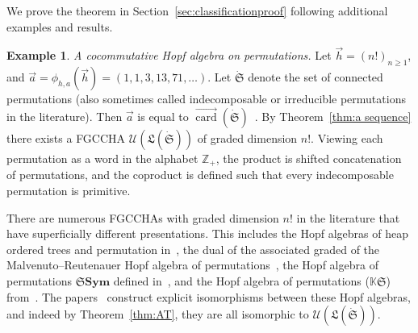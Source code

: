 \documentclass[11pt]{amsart}
\theoremstyle{definition}
\newtheorem{example}[theorem]{Example}
\numberwithin{equation}{section}
\def\ZZ{{\mathbb Z}}
\newcommand{\FGCCHAs}{\textsf{FGCCHA}s\xspace}
\newcommand{\veccard}{\overrightarrow{\operatorname{card}}}
\begin{document}
We prove the theorem in Section~\ref{sec:classificationproof} following additional examples and results. 

\begin{example}
\label{example:hopf_algebras_of_permutations}
\textit{A cocommutative Hopf algebra on permutations.}
    Let $\vec{h} = (n!)_{n \geq 1}$, and $\vec{a} = \phi_{h,a}(\vec{h}) = (1,1,3,13,71,\ldots)$.
    Let $\dot{\mathfrak{S}}$ denote the set of connected permutations \cite{AS05}
    (also sometimes called indecomposable or irreducible permutations in the literature).
    Then $\vec{a}$ is equal to $\veccard(\dot{\mathfrak{S}})$~\cite[\href{https://oeis.org/A003319}{A003319}]{OEIS}.
    By Theorem~\ref{thm:a sequence} there exists a \textsf{FGCCHA}
    $\mathcal{U}(\mathfrak{L}(\dot{\mathfrak{S}}))$ of graded dimension $n!$.
    Viewing each permutation as a word in the alphabet $\ZZ_{+}$, the product is shifted
    concatenation of permutations, and the coproduct is defined such that
    every indecomposable permutation is primitive.
    
    There are numerous \FGCCHAs with graded dimension $n!$ in the literature that have superficially different presentations.  
    This includes the Hopf algebras of heap ordered trees and permutation in~\cite{GL09}, the dual of the associated graded of the Malvenuto--Reutenauer Hopf algebra of permutations~\cite{AS05cc}, the Hopf algebra of permutations $\mathbf{\mathfrak{S}Sym}$ defined in~\cite[\S 3]{HNT08}, and the Hopf algebra of permutations ($\mathbb{K}\mathfrak{S}$) from~\cite[\S 5]{Li15}.
    The papers~\cite{AS05cc, GL09, HNT08, Li15} construct explicit isomorphisms between these Hopf algebras, and indeed by Theorem~\ref{thm:AT}, they are all isomorphic to $\mathcal{U}(\mathfrak{L}(\dot{\mathfrak{S}}))$.
    \end{example}
\end{document}
